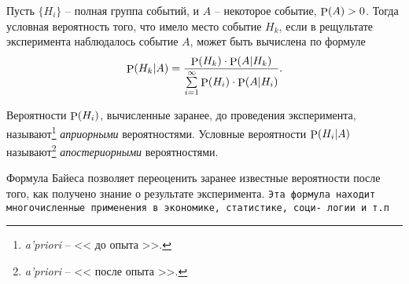 \begin{to_thr}
    Пусть $\{H_i\}$ -- полная группа событий, и $A$ -- некоторое событие, $\P (A) > 0$. Тогда условная вероятность того, что имело место событие $H_k$, если в рещультате эксперимента наблюдалось событие $A$, может быть вычислена по формуле
    \begin{equation}
        \P (H_k | A) = \frac{
        \P (H_k) \cdot \P (A | H_k)
        }{
        \sum\limits_{i=1}^{\infty} \P(H_i)  \cdot \P (A | H_i)
        }.
    \end{equation}
\end{to_thr}

\begin{to_def}
    Вероятности $\P (H_i)$, вычисленные заранее, до проведения эксперимента, называют\footnote{
        \textit{a'priori}  -- << до опыта >>.
    }  \textit{априорными} вероятностями. Условные вероятности $\P(H_i | A)$ называют\footnote{
        \textit{a'priori}  -- << после опыта >>.
    }  \textit{апостериорными} вероятностями.
\end{to_def}

Формула Байеса позволяет переоценить заранее известные вероятности после того, как получено знание о результате эксперимента. 
\texttt{Эта формула находит многочисленные применения в экономике, статистике, соци- логии и т.п}

